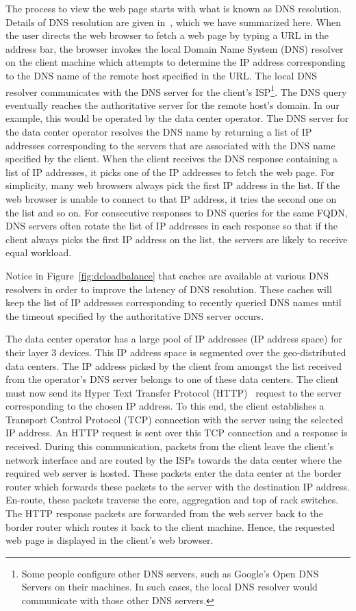 The process to view the web page starts with what is known as DNS resolution. Details of DNS resolution are given in~\cite{rfc1034,rfc1035}, which we have summarized here. When the user directs the web browser to fetch a web page by typing a URL in the address bar, the browser invokes the local Domain Name System (DNS) resolver on the client machine which attempts to determine the IP address corresponding to the DNS name of the remote host specified in the URL. The local DNS resolver communicates with the DNS server for the client's ISP\footnote{Some people configure other DNS servers, such as Google's Open DNS Servers on their machines. In such cases, the local DNS resolver would communicate with those other DNS servers.}. The DNS query eventually reaches the authoritative server for the remote host's domain. In our example, this would be operated by the data center operator. The DNS server for the data center operator resolves the DNS name by returning a list of IP addresses corresponding to the servers that are associated with the DNS name specified by the client. When the client receives the DNS response containing a list of IP addresses, it picks one of the IP addresses to fetch the web page. For simplicity, many web browsers always pick the first IP address in the list. If the web browser is unable to connect to that IP address, it tries the second one on the list and so on. For consecutive responses to DNS queries for the same FQDN, DNS servers often rotate the list of IP addresses in each response so that if the client always picks the first IP address on the list, the servers are likely to receive equal workload.

Notice in Figure~\ref{fig:dcloadbalance} that caches are available at various DNS resolvers in order to improve the latency of DNS resolution. These caches will keep the list of IP addresses corresponding to recently queried DNS names until the timeout specified by the authoritative DNS server occurs.

The data center operator has a large pool of IP addresses (IP address space) for their layer 3 devices. This IP address space is segmented over the geo-distributed data centers. The IP address picked by the client from amongst the list received from the operator's DNS server belongs to one of these data centers. The client must now send its Hyper Text Transfer Protocol (HTTP)~\cite{rfc1945} request to the server corresponding to the chosen IP address. To this end, the client establishes a Transport Control Protocol (TCP) connection with the server using the selected IP address. An HTTP request is sent over this TCP connection and a response is received. During this communication, packets from the client leave the client's network interface and are routed by the ISPs towards the data center where the required web server is hosted. These packets enter the data center at the border router which forwards these packets to the server with the destination IP address. En-route, these packets traverse the core, aggregation and top of rack switches. The HTTP response packets are forwarded from the web server back to the border router which routes it back to the client machine. Hence, the requested web page is displayed in the client's web browser.

